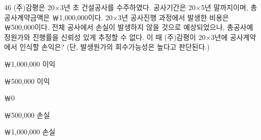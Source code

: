 \begin{question}{46}
(주)감평은 20×3년 초 건설공사를 수주하였다. 공사기간은 20×5년 말까지이며, 총공사계약금액은 ￦1,000,000이다. 20×3년 공사진행 과정에서 발생한 비용은 ￦500,000이다. 전체 공사에서 손실이 발생하지 않을 것으로 예상되었으나, 총공사예정원가와 진행률을 신뢰성 있게 추정할 수 없다. 이 때 (주)감평이 20×3년에 공사계약에서 인식할 손익은? (단, 발생원가의 회수가능성은 높다고 판단된다.)
\begin{choices}
  \item ￦1,000,000 이익
  \item ￦500,000 이익
  \item ￦0
  \item ￦500,000 손실
  \item ￦1,000,000 손실
\end{choices}
\end{question}
